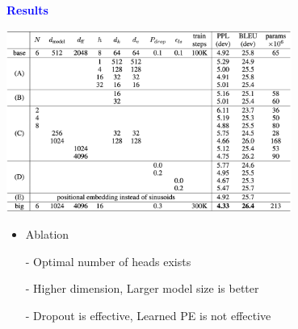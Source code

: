 \documentclass[professionalfont]{beamer}
\begin{document}
\begin{frame}

\begin{center}
    { \textbf{\textcolor{blue}{ {\fontsize{12}{14}\selectfont Results} }} }
\end{center}

\begin{center}
    \includegraphics[width=0.7\textwidth]{table/3.png}
\end{center}

{\fontsize{10}{14}\selectfont 
\begin{itemize}
    \item Ablation

    - Optimal number of heads exists

    - Higher dimension, Larger model size is better

    - Dropout is effective, Learned PE is not effective

\end{itemize}
}

\end{frame}
\end{document}
